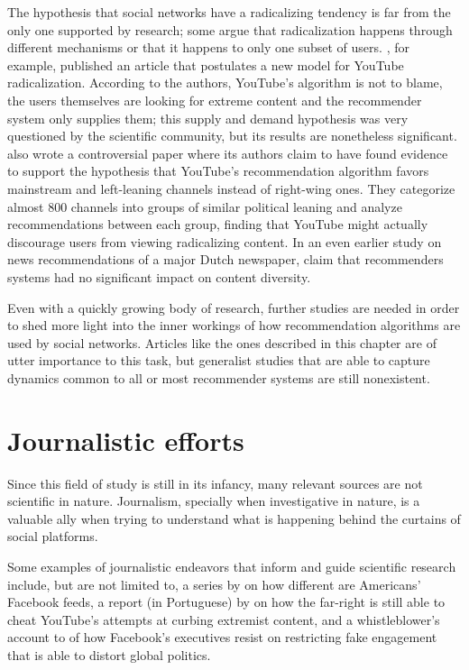 The hypothesis that social networks have a radicalizing tendency is far from the
only one supported by research; some argue that radicalization happens through
different mechanisms or that it happens to only one subset of users.
\citet{munger_right-wing_2020}, for example, published an article that
postulates a new model for YouTube radicalization. According to the authors,
YouTube's algorithm is not to blame, the users themselves are looking for
extreme content and the recommender system only supplies them; this supply and
demand hypothesis was very questioned by the scientific community, but its
results are nonetheless significant. \citet{ledwich_algorithmic_2019} also wrote
a controversial paper where its authors claim to have found evidence to support
the hypothesis that YouTube's recommendation algorithm favors mainstream and
left-leaning channels instead of right-wing ones. They categorize almost 800
channels into groups of similar political leaning and analyze recommendations
between each group, finding that YouTube might actually discourage users from
viewing radicalizing content. In an even earlier study on news recommendations
of a major Dutch newspaper, \citet{moller_not_2018} claim that recommenders
systems had no significant impact on content diversity.

Even with a quickly growing body of research, further studies are needed in
order to shed more light into the inner workings of how recommendation
algorithms are used by social networks. Articles like the ones described in this
chapter are of utter importance to this task, but generalist studies that are
able to capture dynamics common to all or most recommender systems are still
nonexistent.

\section{Journalistic efforts}
\label{cap:journalistic}

Since this field of study is still in its infancy, many relevant sources are not
scientific in nature. Journalism, specially when investigative in nature, is a
valuable ally when trying to understand what is happening behind the curtains of
social platforms.

Some examples of journalistic endeavors that inform and guide scientific
research include, but are not limited to, a series by \citet{lecher_one_nodate}
on how different are Americans' Facebook feeds, a report (in Portuguese) by
\citet{ribeiro_como_2021} on how the far-right is still able to cheat YouTube's
attempts at curbing extremist content, and a whistleblower's account to
\citet{wong_how_2021} of how Facebook's executives resist on restricting
fake engagement that is able to distort global politics.
